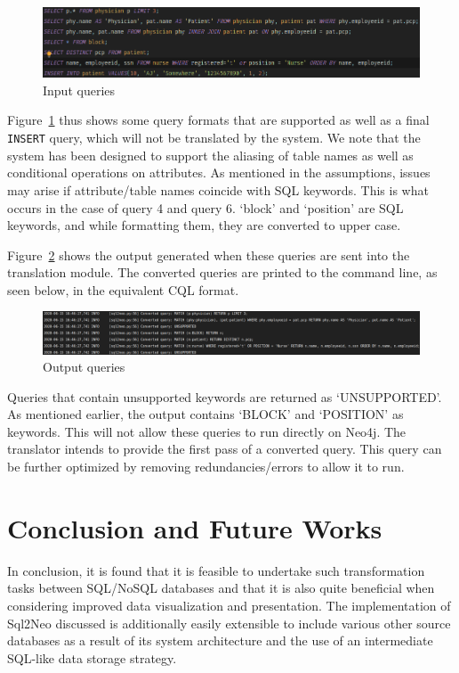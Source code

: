 \documentclass[12pt]{article}
\newcommand{\sectionfontstyle}{\fontsize{16pt}{1em}\usefont{T1}{phv}{b}{n}}
\begin{document}
    \begin{figure}[htb!]
        \centering
        \includegraphics[width=155mm]{img/input_queries.png}
        \caption{Input queries}
        \label{fig:input_queries}
    \end{figure}

    Figure~\ref{fig:input_queries} thus shows some query formats that are supported as well as a final \verb|INSERT| query, which will not be translated by the system. We note that the system has been designed to support the aliasing of table names as well as conditional operations on attributes. As mentioned in the assumptions, issues may arise if attribute/table names coincide with SQL keywords. This is what occurs in the case of query 4 and query 6. `block' and `position' are SQL keywords, and while formatting them, they are converted to upper case.

    Figure~\ref{fig:output_queries} shows the output generated when these queries are sent into the translation module. The converted queries are printed to the command line, as seen below, in the equivalent CQL format.

    \begin{figure}[htb!]
        \centering
        \includegraphics[width=155mm]{img/output_queries.png}
        \caption{Output queries}
        \label{fig:output_queries}
    \end{figure}

    Queries that contain unsupported keywords are returned as `UNSUPPORTED'. As mentioned earlier, the output contains `BLOCK' and `POSITION' as keywords. This will not allow these queries to run directly on Neo4j. The translator intends to provide the first pass of a converted query. This query can be further optimized by removing redundancies/errors to allow it to run.

    \newpage

    \section{\sectionfontstyle Conclusion and Future Works}
    In conclusion, it is found that it is feasible to undertake such transformation tasks between SQL/NoSQL databases and that it is also quite beneficial when considering improved data visualization and presentation. The implementation of Sql2Neo discussed is additionally easily extensible to include various other source databases as a result of its system architecture and the use of an intermediate SQL-like data storage strategy.
\end{document}
